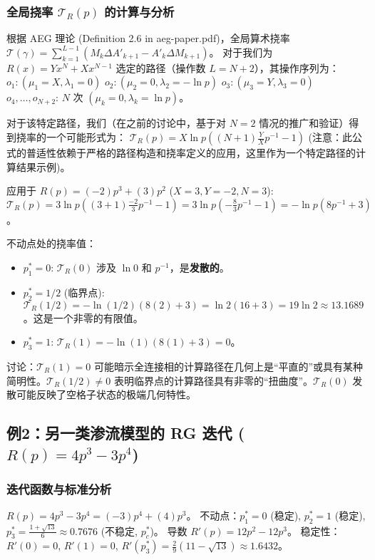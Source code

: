 \documentclass[12pt]{article}
\begin{document}
\subsubsection{全局挠率 $\mathcal{T}_R(p)$ 的计算与分析}
根据 AEG 理论 (Definition 2.6 in aeg-paper.pdf)，全局算术挠率 $\mathcal{T}(\gamma) = \sum_{k=1}^{L-1} (M_k \Delta A'_{k+1} - A'_k \Delta M_{k+1})$。
对于我们为 $R(x) = Yx^N + Xx^{N-1}$ 选定的路径（操作数 $L=N+2$），其操作序列为：
$o_1: (\mu_1=X, \lambda_1=0)$
$o_2: (\mu_2=0, \lambda_2=-\ln p)$
$o_3: (\mu_3=Y, \lambda_3=0)$
$o_4, \dots, o_{N+2}$: $N$ 次 $(\mu_k=0, \lambda_k=\ln p)$。

对于该特定路径，我们（在之前的讨论中，基于对 $N=2$ 情况的推广和验证）得到挠率的一个可能形式为：
$\mathcal{T}_R(p) = X \ln p \left( (N+1) \frac{Y}{X} p^{-1} - 1 \right)$ (注意：此公式的普适性依赖于严格的路径构造和挠率定义的应用，这里作为一个特定路径的计算结果示例)。

应用于 $R(p) = (-2)p^3 + (3)p^2$ ($X=3, Y=-2, N=3$):
$\mathcal{T}_R(p) = 3 \ln p \left( (3+1) \frac{-2}{3} p^{-1} - 1 \right) = 3 \ln p \left( -\frac{8}{3} p^{-1} - 1 \right) = -\ln p (8 p^{-1} + 3)$。

不动点处的挠率值：
\begin{itemize}
    \item $p_1^* = 0$: $\mathcal{T}_R(0)$ 涉及 $\ln 0$ 和 $p^{-1}$，是\textbf{发散的}。
    \item $p_2^* = 1/2$ (临界点): $\mathcal{T}_R(1/2) = -\ln(1/2) (8 (2) + 3) = \ln 2 (16 + 3) = 19 \ln 2 \approx 13.1689$。这是一个非零的有限值。
    \item $p_3^* = 1$: $\mathcal{T}_R(1) = -\ln(1) (8 (1) + 3) = 0$。
\end{itemize}
讨论：$\mathcal{T}_R(1)=0$ 可能暗示全连接相的计算路径在几何上是“平直的”或具有某种简明性。$\mathcal{T}_R(1/2) \neq 0$ 表明临界点的计算路径具有非零的“扭曲度”。$\mathcal{T}_R(0)$ 发散可能反映了空格子状态的极端几何特性。

\subsection{例2：另一类渗流模型的 RG 迭代 ($R(p) = 4p^3 - 3p^4$)}
\subsubsection{迭代函数与标准分析}
$R(p) = 4p^3 - 3p^4 = (-3)p^4 + (4)p^3$。
不动点：$p_1^* = 0$ (稳定), $p_2^* = 1$ (稳定), $p_3^* = \frac{1 + \sqrt{13}}{6} \approx 0.7676$ (不稳定, $p_c^*$)。
导数 $R'(p) = 12p^2 - 12p^3$。
稳定性：$R'(0)=0$, $R'(1)=0$, $R'(p_3^*) = \frac{2}{9}(11 - \sqrt{13}) \approx 1.6432$。
\end{document}
